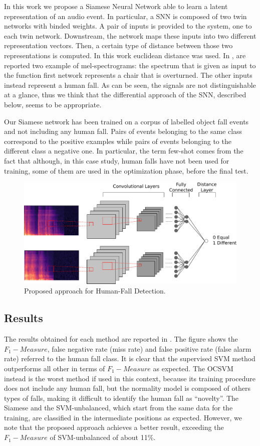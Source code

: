 In this work we propose a Siamese Neural Network able to learn a latent representation of an audio event. In particular, a SNN is composed of two twin networks with binded weights. A pair of inputs is provided to the system, one to each twin network. Downstream, the network maps these inputs into two different representation vectors. Then, a certain type of distance between those two representations is computed. In this work euclidean distance was used. In , are reported two example of mel-spectrograms: the spectrum that is given as input to the function first network represents a chair that is overturned. The other inputs instead represent a human fall. As can be seen, the signals are not distinguishable at a glance, thus we think that the differential approach of the SNN, described below, seems to be appropriate.

Our Siamese network has been trained on a corpus of labelled object fall events and not including any human fall. Pairs of events belonging to the same class correspond to the positive examples while pairs of events belonging to the different class a negative one. In particular, the term few-shot comes from the fact that although, in this case study, human falls have not been used for training, some of them are used in the optimization phase, before the final test.
\begin{figure}
	\centering
	\includegraphics[width=0.7\linewidth]{img/Siamese_approach}
	\caption[Siamese Nets for human-fall detection]{Proposed approach for Human-Fall Detection.}
	\label{proposed_approach}
\end{figure}

\subsection{Results}
The results obtained for each method are reported in . The figure shows the $ F_1 -Measure$, false negative rate (miss rate) and false positive rate (false alarm rate) referred to the human fall class. It is clear that the supervised SVM method outperforms all other in terms of  $ F_1 -Measure$ as expected. The OCSVM instead is the worst method if used in this context, because its training procedure does not include any human fall, but the normality model is composed of others types of falls, making it difficult to identify the human fall as ``novelty''. The Siamese and the SVM-unbalanced, which start from the same data for the training, are classified in the intermediate positions as expected. However, we note that the proposed approach achieves a better result, exceeding the $ F_1 -Measure$ of SVM-unbalanced of about 11\%. 

